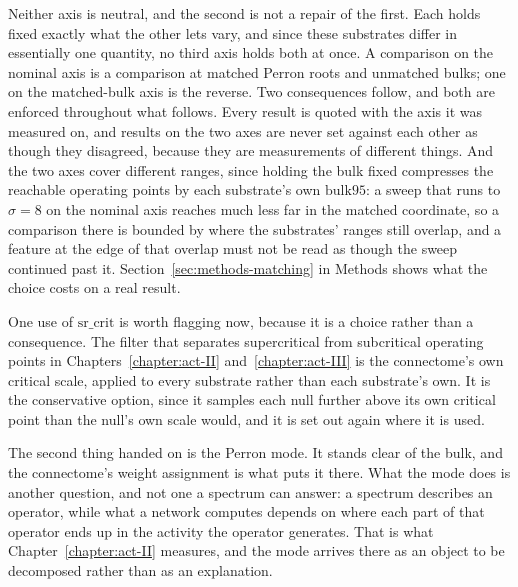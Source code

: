 Neither axis is neutral, and the second is not a repair of the first. Each holds
fixed exactly what the other lets vary, and since these substrates differ in
essentially one quantity, no third axis holds both at once. A comparison on the
nominal axis is a comparison at matched Perron roots and unmatched bulks; one on
the matched-bulk axis is the reverse. Two consequences follow, and both are
enforced throughout what follows. Every result is quoted with the axis it was
measured on, and results on the two axes are never set against each other as
though they disagreed, because they are measurements of different things. And
the two axes cover different ranges, since holding the bulk fixed compresses the
reachable operating points by each substrate's own $\mathrm{bulk95}$: a sweep
that runs to $\sigma = 8$ on the nominal axis reaches much less far in the
matched coordinate, so a comparison there is bounded by where the substrates'
ranges still overlap, and a feature at the edge of that overlap must not be read
as though the sweep continued past it. Section~\ref{sec:methods-matching} in Methods 
shows what the choice costs on a real result.

One use of $\mathrm{sr\_crit}$ is worth flagging now, because it is a choice
rather than a consequence. The filter that separates supercritical from
subcritical operating points in Chapters~\ref{chapter:act-II}
and~\ref{chapter:act-III} is the connectome's own critical scale, applied to
every substrate rather than each substrate's own. It is the conservative
option, since it samples each null further above its own critical point than the
null's own scale would, and it is set out again where it is used.

The second thing handed on is the Perron mode. It stands clear of the bulk, and
the connectome's weight assignment is what puts it there. What the mode does is
another question, and not one a spectrum can answer: a spectrum describes an
operator, while what a network computes depends on where each part of that
operator ends up in the activity the operator generates. That is what
Chapter~\ref{chapter:act-II} measures, and the mode arrives there as an object
to be decomposed rather than as an explanation.



